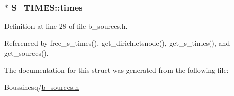 \hypertarget{struct_s___t_i_m_e_s_aef6469545d1fb79d7b87cc35465489ce}{
\subsubsection[{times}]{$\ast$ S\-\_\-\-T\-I\-M\-E\-S\-::times}}\label{struct_s___t_i_m_e_s_aef6469545d1fb79d7b87cc35465489ce}


Definition at line 28 of file b\-\_\-sources.\-h.



Referenced by free\-\_\-s\-\_\-times(), get\-\_\-dirichletsnode(), get\-\_\-s\-\_\-times(), and get\-\_\-sources().



The documentation for this struct was generated from the following file\-:\begin{DoxyCompactItemize}
\item 
Boussinesq/\hyperlink{b__sources_8h}{b\-\_\-sources.\-h}\end{DoxyCompactItemize}
